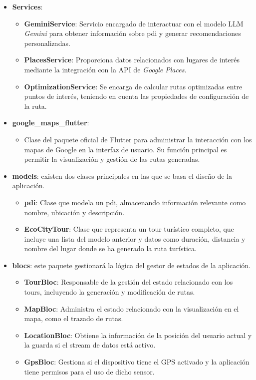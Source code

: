 \begin{itemize}
	\item \textbf{Services}:
	\begin{itemize}
		\item \textbf{GeminiService}: Servicio encargado de interactuar con el modelo LLM \textit{Gemini} para obtener información sobre \acrlong{pdi} y generar recomendaciones personalizadas.
		\item \textbf{PlacesService}: Proporciona datos relacionados con lugares de interés mediante la integración con la API de \textit{Google Places}.
		\item \textbf{OptimizationService}: Se encarga de calcular rutas optimizadas entre puntos de interés, teniendo en cuenta las propiedades de configuración de la ruta.
	\end{itemize}

\item \textbf{google\_maps\_flutter}:
\begin{itemize}
	\item Clase del paquete oficial de Flutter para administrar la interacción con los mapas de Google en la interfaz de usuario. Su función principal es permitir la visualización y gestión de las rutas generadas.
\end{itemize}


	\item \textbf{models}: existen dos clases principales en las que se basa el diseño de la aplicación.
	\begin{itemize}
		\item \textbf{\acrlong{pdi}}: Clase que modela un \acrshort{pdi}, almacenando información relevante como nombre, ubicación y descripción. 
		\item \textbf{EcoCityTour}: Clase que representa un tour turístico completo, que incluye una lista del modelo anterior y datos como duración, distancia y nombre del lugar donde se ha generado la ruta turística.
	\end{itemize}

	\item \textbf{blocs}: este paquete gestionará la lógica del gestor de estados de la aplicación.
	\begin{itemize}
		\item \textbf{TourBloc}: Responsable de la gestión del estado relacionado con los tours, incluyendo la generación y modificación de rutas.
		\item \textbf{MapBloc}: Administra el estado relacionado con la visualización en el mapa, como el trazado de rutas.
		\item \textbf{LocationBloc}: Obtiene la información de la posición del usuario actual y la guarda si el stream de datos está activo.
		\item \textbf{GpsBloc}: Gestiona si el dispositivo tiene el GPS activado y la aplicación tiene permisos para el uso de dicho sensor.
	\end{itemize}


\end{itemize}
